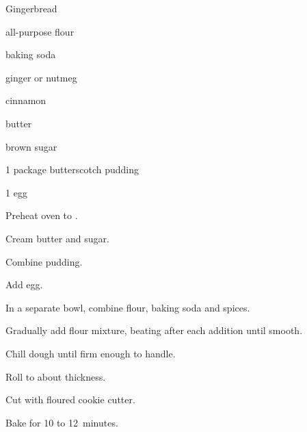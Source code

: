 \begin{recipe}{Gingerbread}{}{}

\begin{ingredients}
\item \C{1 \half} all-purpose flour
\item {} baking soda
\item {} ginger or nutmeg
\item \tp{1 \half} cinnamon
\item \C{\half} butter
\item \C{\half} brown sugar
\item 1 package butterscotch pudding
\item 1 egg
\end{ingredients}

\begin{directions}
\item Preheat oven to .
\item Cream butter and sugar.
\item Combine pudding.
\item Add egg.
\item In a separate bowl, combine flour, baking soda and spices.
\item Gradually add flour mixture, beating after each addition until smooth.
\item Chill dough until firm enough to handle.
\item Roll to about  thickness.
\item Cut with floured cookie cutter.
\item Bake for 10 to 12~minutes.
\end{directions}
\end{recipe}
